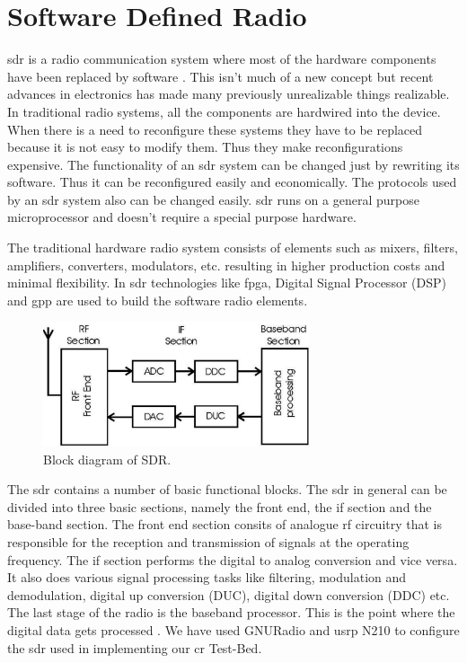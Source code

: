 \chapter{Software Defined Radio}

\gls{sdr} is a radio communication system where most of the 
hardware components have been replaced by software \cite{wikiSDR}. This isn't
much of a new concept but recent advances in electronics has made many
previously unrealizable things realizable. In traditional
radio systems, all the components are hardwired into the device. When there is
a need to reconfigure these systems they have to be replaced because it is
not easy to modify them. Thus they make reconfigurations expensive. The 
functionality of an \gls{sdr} system can be changed just by rewriting its software.
Thus it can be reconfigured easily and economically.
The protocols used by an \gls{sdr} system also can be changed
easily. \gls{sdr} runs on a general
purpose microprocessor and doesn't require a special purpose hardware.

The traditional hardware radio system consists of elements such as mixers, 
filters, amplifiers, converters, modulators, etc. resulting in higher 
production costs and minimal flexibility. In \gls{sdr} technologies like 
\gls{fpga}, Digital Signal Processor (DSP) and 
\gls{gpp} are used to build the software radio elements.


\begin{figure}
  \centering
  \includegraphics[width=0.7\textwidth]{../images/sdrBlock}
  \caption{Block diagram of SDR.}
  \label{sdrBlock}
\end{figure}

The \gls{sdr} contains a number of basic functional blocks.
The \gls{sdr} in general can be divided into three basic sections, namely the front
end, the \gls{if} section and the base-band section. The front end section consits 
of analogue \gls{rf} circuitry that is responsible for the reception and 
transmission of signals at the operating frequency. The \gls{if} section performs
the digital to analog conversion and vice versa. It also does various signal 
processing tasks like filtering, modulation and demodulation, digital up 
conversion (DUC), digital down conversion (DDC) etc. The last stage of the 
radio is the baseband processor. This is the point where the digital data 
gets processed \cite{miller08}\cite{kranthi13}.
We have used GNURadio and \gls{usrp} N210 to configure the \gls{sdr} used in implementing
our \gls{cr} Test-Bed. 

